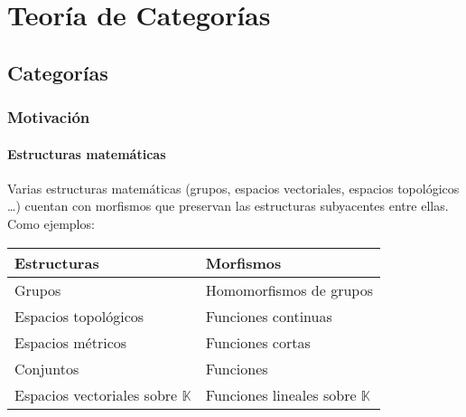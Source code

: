 \documentclass[11pt, fleqn, spanish]{book}
\begin{document}

\pagestyle{empty} %
\tableofcontents %
\cleardoublepage %
\pagestyle{fancy} %


\part{Teoría de Categorías}



\chapter{Categorías}

\section{Motivación}

\subsection{Estructuras matemáticas}
Varias estructuras matemáticas (grupos, espacios vectoriales, espacios
topológicos \dots) cuentan con morfismos que preservan las estructuras
subyacentes entre ellas. Como ejemplos:  

\begin{center}
  \begin{tabular}{l|l}
    Estructuras & Morfismos \\
    \hline
    Grupos & Homomorfismos de grupos \\
    Espacios topológicos & Funciones continuas \\
    Espacios métricos & Funciones cortas \\
    Conjuntos & Funciones \\
    Espacios vectoriales sobre $\mathbb{K}$ & Funciones lineales sobre $\mathbb{K}$ \\
  \end{tabular}
\end{center}
\end{document}
